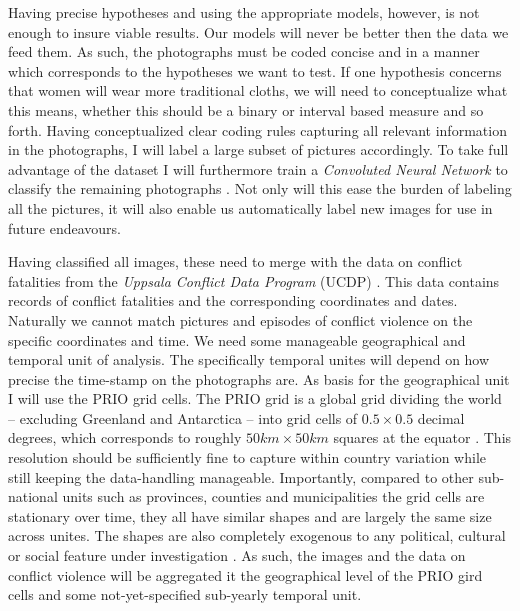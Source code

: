 \documentclass[a4paper]{article}
\begin{document}
Having precise hypotheses and using the appropriate models, however, is not enough to insure viable results. Our models will never be better then the data we feed them. As such, the photographs must be coded concise and in a manner which corresponds to the hypotheses we want to test. If one hypothesis concerns that women will wear more traditional cloths, we will need to conceptualize what this means, whether this should be a binary or interval based measure and so forth. Having conceptualized clear coding rules capturing all relevant information in the photographs, I will label a large subset of pictures accordingly. To take full advantage of the dataset I will furthermore train a \emph{Convoluted Neural Network} to classify the remaining photographs \citep[120-122]{francois2017deep}. Not only will this ease the burden of labeling all the pictures, it will also enable us automatically label new images for use in future endeavours.\par    

Having classified all images, these need to merge with the data on conflict fatalities from the \emph{Uppsala Conflict Data Program} (UCDP) \citep{Sundberg_2013, Croicu_Sundberg_2017, UCDP_2017}. This data contains records of conflict fatalities and the corresponding coordinates and dates. Naturally we cannot match pictures and episodes of conflict violence on the specific coordinates and time. We need some manageable geographical and temporal unit of analysis. The specifically temporal unites will depend on how precise the time-stamp on the photographs are. As basis for the geographical unit I will use the PRIO grid cells. The PRIO grid is a global grid dividing the world -- excluding Greenland and Antarctica -- into grid cells of $0.5 \times 0.5$ decimal degrees, which corresponds to roughly $50km\times50km$ squares at the equator \citep[367]{Tollefsen_2012}. This resolution should be sufficiently fine to capture within country variation while still keeping the data-handling manageable. Importantly, compared to other sub-national units such as provinces, counties and municipalities the grid cells are stationary over time, they all have similar shapes and are largely the same size across unites. The shapes are also completely exogenous to any political, cultural or social feature under investigation \citep[356]{Tollefsen_2012}. As such, the images and the data on conflict violence will be aggregated it the geographical level of the PRIO gird cells and some not-yet-specified sub-yearly temporal unit.\par
\end{document}
